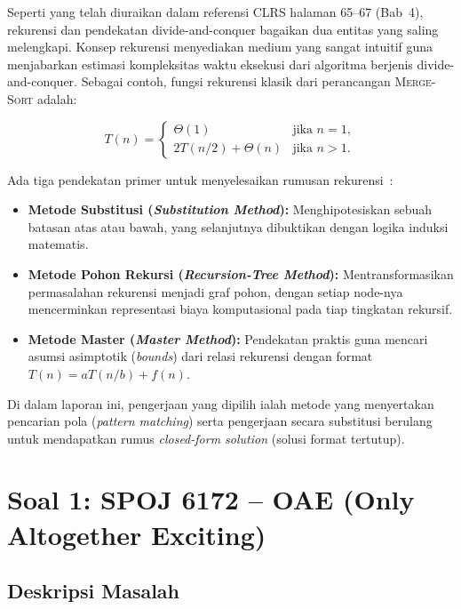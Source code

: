 \documentclass[12pt,a4paper]{article}
\theoremstyle{definition}
\begin{document}
Seperti yang telah diuraikan dalam referensi CLRS halaman 65--67 (Bab~4), rekurensi dan 
pendekatan divide-and-conquer bagaikan dua entitas yang saling melengkapi. Konsep 
rekurensi menyediakan medium yang sangat intuitif guna menjabarkan estimasi kompleksitas 
waktu eksekusi dari algoritma berjenis divide-and-conquer. Sebagai contoh, fungsi 
rekurensi klasik dari perancangan \textsc{Merge-Sort} adalah:

\begin{equation}
  T(n) =
  \begin{cases}
    \Theta(1)           & \text{jika } n = 1,\\
    2T(n/2) + \Theta(n) & \text{jika } n > 1.
  \end{cases}
\end{equation}

Ada tiga pendekatan primer untuk menyelesaikan rumusan rekurensi~\cite{clrs}:

\begin{itemize}
  \item \textbf{Metode Substitusi (\textit{Substitution Method}):} Menghipotesiskan
        sebuah batasan atas atau bawah, yang selanjutnya dibuktikan dengan 
        logika induksi matematis.
  \item \textbf{Metode Pohon Rekursi (\textit{Recursion-Tree Method}):}
        Mentransformasikan permasalahan rekurensi menjadi graf pohon, dengan 
        setiap node-nya mencerminkan representasi biaya komputasional pada tiap 
        tingkatan rekursif.
  \item \textbf{Metode Master (\textit{Master Method}):} Pendekatan praktis guna 
        mencari asumsi asimptotik (\emph{bounds}) dari relasi rekurensi dengan format 
        $T(n) = aT(n/b) + f(n)$.
\end{itemize}

Di dalam laporan ini, pengerjaan yang dipilih ialah metode yang menyertakan 
pencarian pola (\emph{pattern matching}) serta pengerjaan secara substitusi berulang 
untuk mendapatkan rumus \emph{closed-form solution} (solusi format tertutup).

\section{Soal 1: SPOJ 6172 -- OAE (Only Altogether Exciting)}

\subsection{Deskripsi Masalah}
\end{document}
